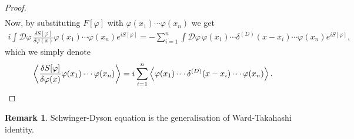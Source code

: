 \documentclass{article}
\theoremstyle{definition}
\newtheorem{remark}{Remark}[section]
\numberwithin{equation}{section}
\newcommand{\fivarphi}{\int \mathscr{D} \varphi\,}
\begin{document}
\begin{proof}
\begin{align}
  \end{align}
  Now, by substituting $F[\varphi]$ with $\varphi(x_1) \cdots \varphi(x_n)$ we get
  \begin{align}
    i\fivarphi \frac{\delta S[\varphi]}{\delta\varphi(x)}  \varphi(x_1) \cdots \varphi(x_n) e^{iS[\varphi]}
    = - \sum_{i = 1}^{n} \fivarphi \varphi(x_1) \cdots \delta^{(D)}(x - x_i) \cdots \varphi(x_n) e^{iS[\varphi]},
  \end{align}
  which we simply denote
  \begin{align}
    \ev{\frac{\delta S[\varphi]}{\delta\varphi(x)}  \varphi(x_1) \cdots \varphi(x_n)}
    = i \sum_{i = 1}^{n} \ev{\varphi(x_1) \cdots \delta^{(D)}(x - x_i) \cdots \varphi(x_n)}.
  \end{align}
\end{proof}

\begin{remark}
  Schwinger-Dyson equation is the generalisation of Ward-Takahashi identity.
\end{remark}
\end{document}
